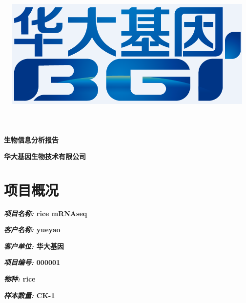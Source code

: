 \documentclass[10pt, oneside,a4paper]{article}
\begin{document}
\vspace{50 mm}
\title{\includegraphics[width=80 mm, keepaspectratio]{./source/BGI-LOGO2.png}}
\maketitle
\vspace{30 mm}
\begin{center}
\huge{\textbf {生物信息分析报告}}\par
\vspace{50 mm}
\textbf{\large{华大基因生物技术有限公司}}\par
\end{center}
\newpage
\renewcommand{\contentsname}{目录}
\tableofcontents
\newpage
\section{项目概况}
\vspace{25 mm}
\textbf{\textit{\large{项目名称: }}\large{rice mRNAseq}}\par
\vspace{5 mm}
\textbf{\textit{\large{客户名称: }}\large{yueyao}}\par
\vspace{5 mm}
\textbf{\textit{\large{客户单位: }}\large{华大基因}}\par
\vspace{5 mm}
\textbf{\textit{\large{项目编号: }}\large{000001}}\par
\vspace{5 mm}
\textbf{\textit{\large{物\hspace{2 em}种: }}\large{rice}}\par
\vspace{5 mm}
\textbf{\textit{\large{样本数量: }}\large{CK-1}}\par
\newpage
\end{document}
